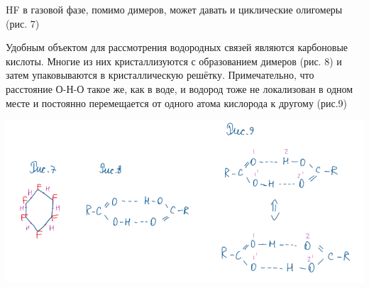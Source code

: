 \documentclass[14pt,a4paper]{scrartcl}
\begin{document}
HF в газовой фазе, помимо димеров, может давать и циклические олигомеры (рис. 7)

Удобным объектом для рассмотрения водородных связей являются карбоновые кислоты. Многие из них кристаллизуются с образованием димеров (рис. 8) и затем упаковываются в
кристаллическую решётку. Примечательно, что расстояние О-Н-О такое же, как в воде, и водород тоже не локализован в одном месте и постоянно перемещается от одного атома
кислорода к другому (рис.9)

\includegraphics{17v2.png}
\end{document}
